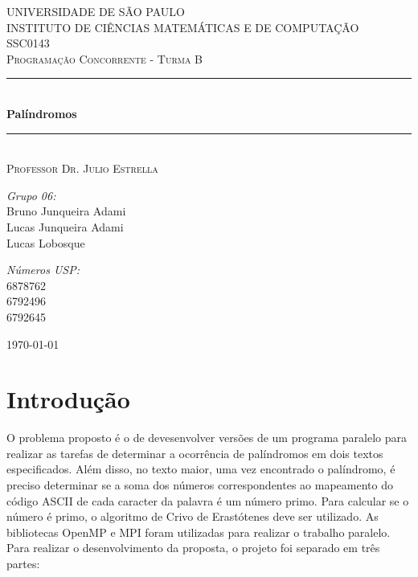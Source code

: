 \documentclass[a4paper]{article}
\newcommand{\HRule}{\rule{\linewidth}{0.5mm}}
\begin{document}
\begin{titlepage}
\begin{center}	

\textsc{\Large UNIVERSIDADE DE SÃO PAULO\\
	INSTITUTO DE CIÊNCIAS MATEMÁTICAS E DE COMPUTAÇÃO}\\[0.7cm]

\textsc{\Large SSC0143}\\[0.2cm]
\textsc{\Large Programação Concorrente - Turma B}\\[0.5cm]

\HRule \\[0.4cm]
{ \huge \bfseries Palíndromos}\\[0.4cm]
\HRule \\[0.4cm]
\textsc{Professor Dr. Julio Estrella}\\[1.5cm]

\begin{minipage}{0.4\textwidth}
\begin{flushleft} \large
\emph{Grupo 06:}\\
Bruno Junqueira Adami\\
Lucas Junqueira Adami\\
Lucas Lobosque\\
\end{flushleft}
\end{minipage}
\begin{minipage}{0.4\textwidth}
\begin{flushright} \large
\emph{Números USP:}\\
6878762\\
6792496\\
6792645\\
\end{flushright}
\end{minipage}

\vfill

{\large \today}
	
\end{center}
\end{titlepage}

\section{Introdução}
\indent \indent O problema proposto é o de devesenvolver versões de um programa paralelo para realizar as tarefas de determinar a ocorrência de palíndromos em dois textos especificados. Além disso, no texto maior, uma vez encontrado o palíndromo, é preciso determinar se a soma dos números correspondentes ao mapeamento do código ASCII de cada caracter da palavra é um número primo. Para calcular se o número é primo, o algoritmo de Crivo de Erastótenes deve ser utilizado. As bibliotecas OpenMP e MPI foram utilizadas para realizar o trabalho paralelo.\\
Para realizar o desenvolvimento da proposta, o projeto foi separado em três partes:
\end{document}
